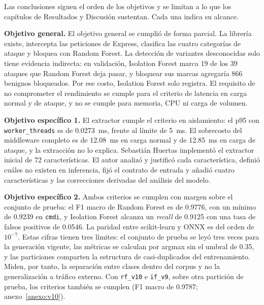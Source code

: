 Las conclusiones siguen el orden de los objetivos y se limitan a lo que los capítulos de Resultados y Discusión sustentan. Cada una indica su alcance.

\textbf{Objetivo general.} El objetivo general se cumplió de forma parcial. La librería existe, intercepta las peticiones de Express, clasifica las cuatro categorías de ataque y bloquea con Random Forest. La detección de variantes desconocidas solo tiene evidencia indirecta: en validación, Isolation Forest marca 19 de los 39 ataques que Random Forest deja pasar, y bloquear sus marcas agregaría 866 benignos bloqueados. Por ese costo, Isolation Forest solo registra. El requisito de no comprometer el rendimiento se cumple para el criterio de latencia en carga normal y de ataque, y no se cumple para memoria, CPU ni carga de volumen.

\textbf{Objetivo específico 1.} El extractor cumple el criterio en aislamiento: el p95 con \texttt{worker\_threads} es de 0.0273~ms, frente al límite de 5~ms. El sobrecosto del middleware completo es de 12.08~ms en carga normal y de 12.85~ms en carga de ataque, y la extracción no lo explica. Sebastián Huertas implementó el extractor inicial de 72 características. El autor analizó y justificó cada característica, definió cuáles no existen en inferencia, fijó el contrato de entrada y añadió cuatro características y las correcciones derivadas del análisis del modelo.

\textbf{Objetivo específico 2.} Ambos criterios se cumplen con margen sobre el conjunto de prueba: el F1 macro de Random Forest es de 0.9776, con un mínimo de 0.9239 en \texttt{cmdi}, y Isolation Forest alcanza un \textit{recall} de 0.9125 con una tasa de falsos positivos de 0.0546. La paridad entre scikit-learn y ONNX es del orden de $10^{-7}$. Estas cifras tienen tres límites: el conjunto de prueba se leyó tres veces para la generación vigente, las métricas se calculan por argmax sin el umbral de 0.35, y las particiones comparten la estructura de casi-duplicados del entrenamiento. Miden, por tanto, la separación entre clases dentro del corpus y no la generalización a tráfico externo. Con \texttt{rf\_v10} e \texttt{if\_v9}, sobre otra partición de prueba, los criterios también se cumplen (F1 macro de 0.9787; anexo~\ref{anexo:v10}).

